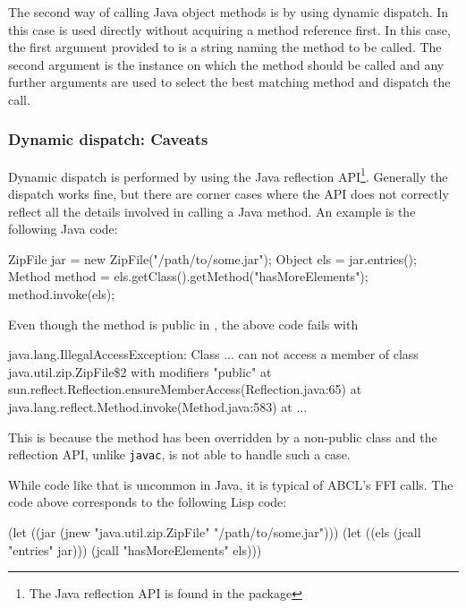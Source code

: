 \documentclass[10pt]{book}
\begin{document}
The second way of calling Java object methods is by using dynamic dispatch.
In this case  is used directly without acquiring a method
reference first. In this case, the first argument provided to 
is a string naming the method to be called. The second argument is the instance
on which the method should be called and any further arguments are used to
select the best matching method and dispatch the call.

\subsubsection{Dynamic dispatch: Caveats}

Dynamic dispatch is performed by using the Java reflection
API\footnote{The Java reflection API is found in the
   package}. Generally the dispatch works
fine, but there are corner cases where the API does not correctly
reflect all the details involved in calling a Java method. An example
is the following Java code:

\begin{listing-java}
ZipFile jar = new ZipFile("/path/to/some.jar");
Object els = jar.entries();
Method method = els.getClass().getMethod("hasMoreElements");
method.invoke(els);
\end{listing-java}

Even though the method  is public in
, the above code fails with

\begin{listing-java}
java.lang.IllegalAccessException: Class ... can
not access a member of class java.util.zip.ZipFile\$2 with modifiers
"public"
       at sun.reflect.Reflection.ensureMemberAccess(Reflection.java:65)
       at java.lang.reflect.Method.invoke(Method.java:583)
       at ...
\end{listing-java}

This is because the method has been overridden by a non-public class and
the reflection API, unlike \texttt{javac}, is not able to handle such a case.

While code like that is uncommon in Java, it is typical of ABCL's FFI
calls. The code above corresponds to the following Lisp code:

\begin{listing-lisp}
(let ((jar (jnew "java.util.zip.ZipFile" "/path/to/some.jar")))
  (let ((els (jcall "entries" jar)))
    (jcall "hasMoreElements" els)))
\end{listing-lisp}
\end{document}
